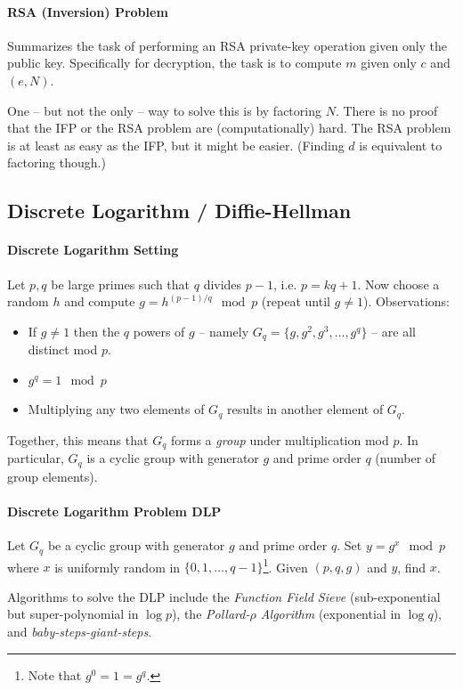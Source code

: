 \paragraph{RSA (Inversion) Problem}
Summarizes the task of performing an RSA private-key operation given only the public key.
Specifically for decryption, the task is to compute $m$ given only $c$ and $(e, N)$.

One -- but not the only -- way to solve this is by factoring $N$.
There is no proof that the IFP or the RSA problem are (computationally) hard.
The RSA problem is at least as easy as the IFP, but it might be easier.
(Finding $d$ is equivalent to factoring though.)


\subsection{Discrete Logarithm / Diffie-Hellman}

\paragraph{Discrete Logarithm Setting}
Let $p, q$ be large primes such that $q$ divides $p-1$, i.e. $p = kq + 1$.
Now choose a random $h$ and compute $g = h^{(p-1)/q} \mod p$ (repeat until $g \neq 1$).
Observations:
\begin{itemize}
\item
If $g \neq 1$ then the $q$ powers of $g$ -- namely $G_q = \{ g, g^2, g^3, \dots, g^q \}$
-- are all distinct mod $p$.
\item
$g^q = 1 \mod p$
\item
Multiplying any two elements of $G_q$ results in another element of $G_q$.
\end{itemize}
Together, this means that $G_q$ forms a \emph{group} under multiplication mod $p$.
In particular, $G_q$ is a cyclic group with generator $g$ and prime order $q$ (number of group elements).

\paragraph{Discrete Logarithm Problem DLP}
Let $G_q$ be a cyclic group with generator $g$ and prime order $q$.
Set $y = g^x \mod p$ where $x$ is uniformly random in $\{ 0, 1, \dots , q-1 \}$\footnote{Note that $g^0 = 1 = g^q$.}.
Given $(p,q,g)$ and $y$, find $x$.

Algorithms to solve the DLP include the \emph{Function Field Sieve}
(sub-exponential but super-polynomial in $\log p$),
the \emph{Pollard-$\rho$ Algorithm} (exponential in $\log q$),
and \emph{baby-steps-giant-steps}.


